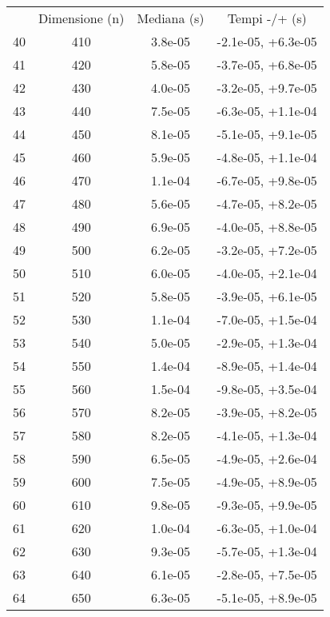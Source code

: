 \begin{table}
\centering
\begin{adjustbox}{width=1\textwidth/2}
\begin{tabular}{|c|c|c|c|}
\hline
 & Dimensione (n) & Mediana (s) & Tempi -/+ (s) \\
40 & 410 & 3.8e-05 & -2.1e-05, +6.3e-05 \\
\cline{1-4}
41 & 420 & 5.8e-05 & -3.7e-05, +6.8e-05 \\
\cline{1-4}
42 & 430 & 4.0e-05 & -3.2e-05, +9.7e-05 \\
\cline{1-4}
43 & 440 & 7.5e-05 & -6.3e-05, +1.1e-04 \\
\cline{1-4}
44 & 450 & 8.1e-05 & -5.1e-05, +9.1e-05 \\
\cline{1-4}
45 & 460 & 5.9e-05 & -4.8e-05, +1.1e-04 \\
\cline{1-4}
46 & 470 & 1.1e-04 & -6.7e-05, +9.8e-05 \\
\cline{1-4}
47 & 480 & 5.6e-05 & -4.7e-05, +8.2e-05 \\
\cline{1-4}
48 & 490 & 6.9e-05 & -4.0e-05, +8.8e-05 \\
\cline{1-4}
49 & 500 & 6.2e-05 & -3.2e-05, +7.2e-05 \\
\cline{1-4}
50 & 510 & 6.0e-05 & -4.0e-05, +2.1e-04 \\
\cline{1-4}
51 & 520 & 5.8e-05 & -3.9e-05, +6.1e-05 \\
\cline{1-4}
52 & 530 & 1.1e-04 & -7.0e-05, +1.5e-04 \\
\cline{1-4}
53 & 540 & 5.0e-05 & -2.9e-05, +1.3e-04 \\
\cline{1-4}
54 & 550 & 1.4e-04 & -8.9e-05, +1.4e-04 \\
\cline{1-4}
55 & 560 & 1.5e-04 & -9.8e-05, +3.5e-04 \\
\cline{1-4}
56 & 570 & 8.2e-05 & -3.9e-05, +8.2e-05 \\
\cline{1-4}
57 & 580 & 8.2e-05 & -4.1e-05, +1.3e-04 \\
\cline{1-4}
58 & 590 & 6.5e-05 & -4.9e-05, +2.6e-04 \\
\cline{1-4}
59 & 600 & 7.5e-05 & -4.9e-05, +8.9e-05 \\
\cline{1-4}
60 & 610 & 9.8e-05 & -9.3e-05, +9.9e-05 \\
\cline{1-4}
61 & 620 & 1.0e-04 & -6.3e-05, +1.0e-04 \\
\cline{1-4}
62 & 630 & 9.3e-05 & -5.7e-05, +1.3e-04 \\
\cline{1-4}
63 & 640 & 6.1e-05 & -2.8e-05, +7.5e-05 \\
\cline{1-4}
64 & 650 & 6.3e-05 & -5.1e-05, +8.9e-05 \\

\end{tabular}
\end{adjustbox}
\end{table}
